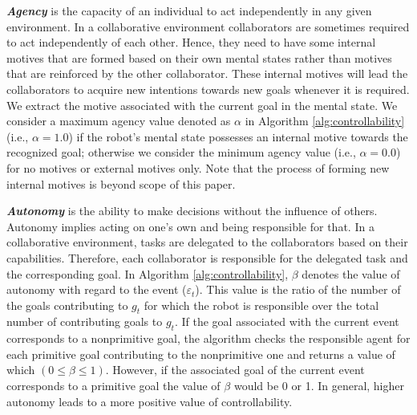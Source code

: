 \textit{\textbf{Agency}} is the capacity of an individual to act independently
in any given environment. In a collaborative environment collaborators are
sometimes required to act independently of each other. Hence, they need to have
some internal motives that are formed based on their own mental states rather
than motives that are reinforced by the other collaborator. These internal
motives will lead the collaborators to acquire new intentions towards new goals
whenever it is required. We extract the motive associated with the current goal
in the mental state. We consider a maximum agency value denoted as $\alpha$ in
Algorithm \ref{alg:controllability} (i.e., $\alpha=1.0$) if the robot's mental
state possesses an internal motive towards the recognized goal; otherwise we
consider the minimum agency value (i.e., $\alpha=0.0$) for no motives or
external motives only. Note that the process of forming new internal motives is
beyond scope of this paper.

% 

\textit{\textbf{Autonomy}} is the ability to make decisions without the
influence of others. Autonomy implies acting on one's own and being responsible for that. In
a collaborative environment, tasks are delegated to the collaborators based on
their capabilities. Therefore, each collaborator is responsible for the
delegated task and the corresponding goal. In Algorithm
\ref{alg:controllability}, $\beta$ denotes the value of autonomy with regard to
the event ($\varepsilon_t$). This value is the ratio of the number of the
goals contributing to $\mathit{g}_{t}$ for which the robot is responsible over
the total number of contributing goals to $\mathit{g}_{t}$. If the goal
associated with the current event corresponds to a nonprimitive goal, the
algorithm checks the responsible agent for each primitive goal contributing to
the nonprimitive one and returns a value of which $(0 \leq \beta \leq 1)$.
However, if the associated goal of the current event corresponds to a primitive
goal the value of $\beta$ would be 0 or 1. In general, higher autonomy leads to
a more positive value of controllability.

